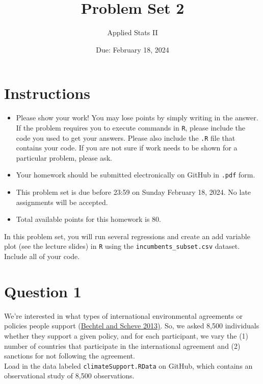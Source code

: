 \documentclass{article} %
\title{Problem Set 2}
\date{Due: February 18, 2024}
\author{Applied Stats II}
\begin{document}
	\maketitle
	\section*{Instructions}
	\begin{itemize}
		\item Please show your work! You may lose points by simply writing in the answer. If the problem requires you to execute commands in \texttt{R}, please include the code you used to get your answers. Please also include the \texttt{.R} file that contains your code. If you are not sure if work needs to be shown for a particular problem, please ask.
		\item Your homework should be submitted electronically on GitHub in \texttt{.pdf} form.
		\item This problem set is due before 23:59 on Sunday February 18, 2024. No late assignments will be accepted.
		\item Total available points for this homework is 80.
	\end{itemize}

	
	\vspace{.25cm}
	
\noindent In this problem set, you will run several regressions and create an add variable plot (see the lecture slides) in \texttt{R} using the \texttt{incumbents\_subset.csv} dataset. Include all of your code.

	\vspace{.25cm}
\section*{Question 1} %
\vspace{.25cm}
\noindent We're interested in what types of international environmental agreements or policies people support (\href{https://www.pnas.org/content/110/34/13763}{Bechtel and Scheve 2013)}. So, we asked 8,500 individuals whether they support a given policy, and for each participant, we vary the (1) number of countries that participate in the international agreement and (2) sanctions for not following the agreement. \\

\noindent Load in the data labeled \texttt{climateSupport.RData} on GitHub, which contains an observational study of 8,500 observations.
\end{document}

